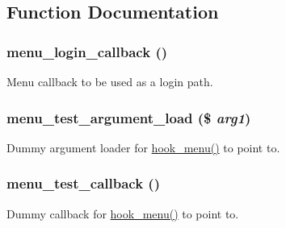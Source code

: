 \subsection{Function Documentation}
\hypertarget{menu__test_8module_a74184541e43d378aa431a03383d6544d}{
\subsubsection[{menu\_\-login\_\-callback}]{\setlength{\rightskip}{0pt plus 5cm}menu\_\-login\_\-callback ()}}
\label{menu__test_8module_a74184541e43d378aa431a03383d6544d}
Menu callback to be used as a login path. \hypertarget{menu__test_8module_aadd0c78cb9691e6ce78789c5d177c09f}{
\subsubsection[{menu\_\-test\_\-argument\_\-load}]{\setlength{\rightskip}{0pt plus 5cm}menu\_\-test\_\-argument\_\-load (\$ {\em arg1})}}
\label{menu__test_8module_aadd0c78cb9691e6ce78789c5d177c09f}
Dummy argument loader for \hyperlink{group__hooks_ga5c95244fea59b25666e409759e133ded}{hook\_\-menu()} to point to. \hypertarget{menu__test_8module_aadf5ae83f682b596600d8bcd014bd7ea}{
\subsubsection[{menu\_\-test\_\-callback}]{\setlength{\rightskip}{0pt plus 5cm}menu\_\-test\_\-callback ()}}
\label{menu__test_8module_aadf5ae83f682b596600d8bcd014bd7ea}
Dummy callback for \hyperlink{group__hooks_ga5c95244fea59b25666e409759e133ded}{hook\_\-menu()} to point to.

